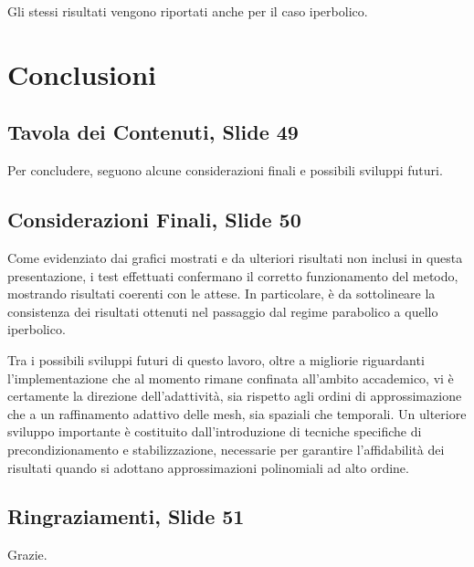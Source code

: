 \documentclass[12pt]{article}
\begin{document}
    Gli stessi risultati vengono riportati anche per il caso iperbolico.

    \newpage
    \section{Conclusioni}

    \subsection{Tavola dei Contenuti, Slide 49}

    Per concludere, seguono alcune considerazioni finali e possibili sviluppi futuri.

    \subsection{Considerazioni Finali, Slide 50}

    Come evidenziato dai grafici mostrati e da ulteriori risultati non inclusi in questa presentazione, i test effettuati confermano il corretto funzionamento del metodo, mostrando risultati coerenti con le attese. In particolare, è da sottolineare la consistenza dei risultati ottenuti nel passaggio dal regime parabolico a quello iperbolico.

    Tra i possibili sviluppi futuri di questo lavoro, oltre a migliorie riguardanti l'implementazione che al momento rimane confinata all'ambito accademico, vi è certamente la direzione dell'adattività, sia rispetto agli ordini di approssimazione che a un raffinamento adattivo delle mesh, sia spaziali che temporali. Un ulteriore sviluppo importante è costituito dall'introduzione di tecniche specifiche di precondizionamento e stabilizzazione, necessarie per garantire l'affidabilità dei risultati quando si adottano approssimazioni polinomiali ad alto ordine.

    \subsection{Ringraziamenti, Slide 51}

    Grazie.
\end{document}
